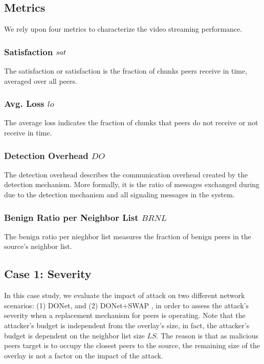 \subsection{Metrics}

We rely upon four metrics to characterize the video streaming performance.

\subsubsection*{Satisfaction $sat$} The satisfaction or satisfaction is the fraction of chunks peers receive in time, averaged over all peers. 
\subsubsection*{Avg. Loss $lo$} The average loss indicates the fraction of chunks that peers do not receive or not receive in time. 
\subsubsection*{Detection Overhead $DO$} The detection overhead describes the communication overhead created by the detection mechanism. More formally, it is the ratio of messages exchanged during due to the detection mechanism and all signaling messages in the system.
\subsubsection*{Benign Ratio per Neighbor List $BRNL$} The benign ratio per nieghbor list measures the fraction of benign peers in the source's neighbor list.

\subsection{Case 1: \drop Severity}

In this case study, we evaluate the impact of \drop attack on two different network scenarios:  (1) DONet, and (2) DONet+SWAP \cite{nguyen2016swap}, in order to assess the attack's severity when a replacement mechanism for peers is operating.
Note that the attacker's budget is independent from the overlay's size, in fact, the attacker's budget is dependent on the neighbor list size $LS$.
The reason is that as malicious peers target is to occupy the closest peers to the source, the remaining size of the overlay is not a factor on the impact of the \drop attack.

